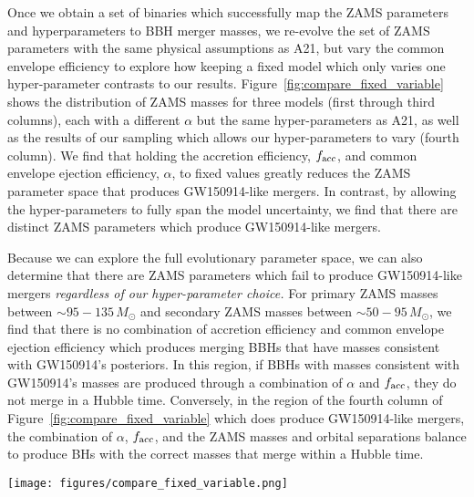\documentclass[twocolumn]{aastex631}
\newcommand{\kw}[1]{{\color{rb4}[KW: #1 ]}}
\newcommand{\kb}[1]{\textcolor{pink}{#1}}
\begin{document}
Once we obtain a set of binaries which successfully map the ZAMS parameters and
hyperparameters to BBH merger masses, we re-evolve the set of ZAMS parameters
with the same physical assumptions as A21, but vary the common envelope
efficiency to explore how keeping a fixed model which only varies one
hyper-parameter contrasts to our results.
Figure~\ref{fig:compare_fixed_variable} shows the distribution of ZAMS masses
for three models (first through third columns), each with a different $\alpha$
but the same hyper-parameters as A21, as well as the results of our sampling
which allows our hyper-parameters to vary (fourth column). We find that holding
the accretion efficiency, $f_{\rm{acc}}$, and common envelope ejection
efficiency, $\alpha$, to fixed values greatly reduces the ZAMS parameter space
that produces GW150914-like mergers. In contrast, by allowing the
hyper-parameters to fully span the model uncertainty, we find that there are
distinct ZAMS parameters which produce GW150914-like mergers.  

Because we can explore the full evolutionary parameter space, we can also
determine that there are ZAMS parameters which fail to produce GW150914-like
mergers \emph{regardless of our hyper-parameter choice.} For primary ZAMS masses
between $\sim95-135\,M_{\odot}$ and secondary ZAMS masses between
$\sim50-95\,M_{\odot}$, we find that there is no combination of accretion
efficiency and common envelope ejection efficiency which produces merging BBHs
that have masses consistent with GW150914's posteriors. In this region, if BBHs
with masses consistent with GW150914's masses are produced through a combination
of $\alpha$ and $f_{\rm{acc}}$, they do not merge in a Hubble time. Conversely,
in the region of the fourth column of Figure~\ref{fig:compare_fixed_variable}
which does produce GW150914-like mergers, the combination of $\alpha$,
$f_{\rm{acc}}$, and the ZAMS masses and orbital separations balance to produce
BHs with the correct masses that merge within a Hubble time.


\begin{figure*}
    \texttt{[image: figures/compare\_fixed\_variable.png]}
    \caption{Comparison of ZAMS masses for binaries which produce GW150914-like mergers for three variations of $\alpha$
     with fixed set of parameter assumptions matching those of A22 (first three columns) and for binaries which produce 
     GW150914-like mergers when $\alpha$, $f_{\mathrm{acc}}$, and $q_{c,3}$ are allowed to vary, (fourth column).}
    \label{fig:compare_fixed_variable}
\end{figure*}
\end{document}
